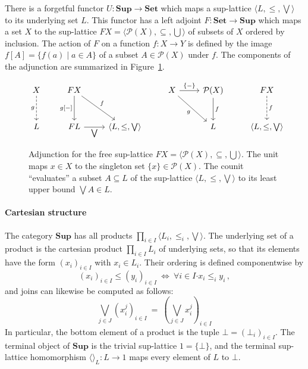 \documentclass[11pt,oneside,draft]{book}
\theoremstyle{definition}
\newcommand{\bdot}{\boldsymbol{\cdot}}
\begin{document}
There is a forgetful functor
$U : \mathbf{Sup} \rightarrow \mathbf{Set}$
which maps a sup-lattice $\langle L, {\le}, {\bigvee} \rangle$
to its underlying set $L$.
This functor has a left adjoint
$F : \mathbf{Set} \rightarrow \mathbf{Sup}$
which maps a set $X$ to the sup-lattice
$F X = \langle \mathcal{P}(X), {\subseteq}, {\bigcup} \rangle$
of subsets of $X$ ordered by inclusion.
The action of $F$ on a function $f : X \rightarrow Y$
is defined by the image $f[A] = \{ f(a) \mid a \in A \}$
of a subset $A \in \mathcal{P}(X)$ under $f$.
The components of the adjunction are summarized
in Figure~\ref{fig:pow}.


\begin{figure} %
  \[
    \begin{tikzcd}[row sep=large]
      X \ar[d, "g"', dashed] &
      F X \ar[d, "{g[-]}"'] \ar[dr, "f"] &
      &
      X \ar[r, "\{ - \}"] \ar[dr, "g"'] &
      \mathcal{P}(X) \ar[d, "f"] &
      F X \ar[d, "f", dashed]
      \\
      L &
      F L \ar[r, "{\bigvee}"'] &
      \langle L, {\le}, {\bigvee} \rangle &
      &
      L &
      \langle L, {\le}, {\bigvee} \rangle
    \end{tikzcd}
  \]
  \caption[Adjunction for the free sup-lattice]%
   {Adjunction for the free sup-lattice
    $F X = \langle \mathcal{P}(X), {\subseteq}, {\bigcup} \rangle$.
    The unit maps $x \in X$
    to the singleton set $\{ x \} \in \mathcal{P}(X)$.
    The counit ``evaluates'' a subset $A \subseteq L$
    of the sup-lattice $\langle L, {\le}, {\bigvee} \rangle$
    to its least upper bound $\bigvee A \in L$.}
  \label{fig:pow}
\end{figure}

\paragraph{Cartesian structure} %

The category $\mathbf{Sup}$ has all products
$\prod_{i \in I} \langle L_i, {\le_i}, \bigvee \rangle$.
The underlying set of a product
is the cartesian product $\prod_{i \in I} L_i$
of underlying sets,
so that its elements have the form $(x_i)_{i \in I}$
with $x_i \in L_i$.
Their ordering is defined componentwise by
\[
  (x_i)_{i \in I} \le (y_i)_{i \in I}
  \: \Leftrightarrow \:
  \forall i \in I \bdot x_i \le_i y_i
  \,,
\]
and joins can likewise be computed as follows:
\[
  \bigvee_{j \in J} (x_i^j)_{i \in I}
  \: = \:
  \left( \bigvee_{j \in J} x_i^j \right)_{i \in I}
\]
In particular,
the bottom element of a product
is the tuple $\bot = (\bot_i)_{i \in I}$.
The terminal object
of $\mathbf{Sup}$ is the trivial sup-lattice $1 = \{ \bot \}$,
and the terminal sup-lattice homomorphism
$\langle \rangle_L : L \rightarrow 1$
maps every element of $L$ to $\bot$.
\end{document}

